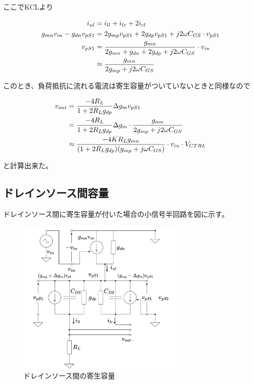 \documentclass[twocolumn]{jsarticle}
\begin{document}
    ここでKCLより

    \begin{align}
        i_{ul} &= i_{ll}+i_{lr}+2i_{cl}     \notag\\
        g_{mn}v_{in}-g_{dn}v_{pS1} &= 2g_{mp}v_{pS1}+2g_{dp}v_{pS1}+j2\omega C_{GS}\cdot v_{pS1}     \notag\\
        v_{pS1} &= \frac{g_{mn}}{2g_{mn}+g_{dn}+2g_{dp}+j2\omega C_{GS}}\cdot v_{in}    \notag\\
        &\approx \frac{g_{mn}}{2g_{mp}+j2\omega C_{GS}}     \label{eq:vps_gc}
    \end{align}

    このとき、負荷抵抗に流れる電流は寄生容量がついていないときと同様なので

    \begin{align}
        v_{out}&=\frac{-4R_{L}}{1+2R_{L}g_{dp}}\Delta g_{m}v_{pS1}      \notag\\
        &= \frac{-4R_{L}}{1+2R_{L}g_{dp}}\Delta g_{m}\cdot \frac{g_{mn}}{2g_{mp}+j2\omega C_{GS}}   \notag\\
        &\approx\frac{-4KR_{L}g_{mn}}{(1+2R_{L}g_{dp})(g_{mp}+j\omega C_{GS})}\cdot v_{in}\cdot V_{CTRL}    \label{eq:vout_gs}
    \end{align}

    と計算出来た。

    \subsection{ドレインソース間容量}
    ドレインソース間に寄生容量が付いた場合の小信号半回路を図に示す。

    \begin{figure}[b]
        \begin{center}
            \includegraphics*[width=80mm]{figures/FoldedGilbert_DS_Half_Equivalent.png}
            \caption{ドレインソース間の寄生容量}
            \label{fig:cds}
        \end{center}
    \end{figure}
\end{document}
